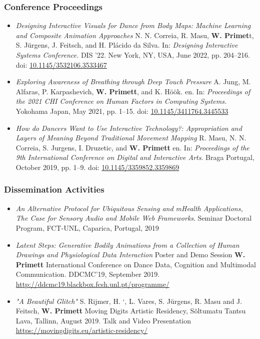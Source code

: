 \subsubsection{Conference Proceedings}
\begin{itemize}
    \item[] \textit{Designing Interactive Visuals for Dance from Body Maps: Machine Learning and
    Composite Animation Approaches}
    N. N. Correia, R. Masu, \textbf{W. Primet}t, S. Jürgens, J. Feitsch, and H. Plácido da Silva.
    In: \textit{Designing Interactive Systems Conference.}
    DIS ’22. New York, NY, USA, June 2022, pp. 204–216. doi: \url{10.1145/3532106.3533467}

    \item[] \textit{Exploring Awareness of Breathing through Deep Touch Pressure}
    A. Jung, M. Alfaras, P. Karpashevich, \textbf{W. Primett}, and K. Höök.
    en. In: \textit{Proceedings of the 2021 CHI Conference on Human Factors in Computing Systems.} Yokohama Japan, May 2021,
    pp. 1–15. doi: \url{10.1145/3411764.3445533}

    \item[] \textit{How do Dancers Want to Use Interactive Technology?: Appropriation and Layers of Meaning Beyond Traditional Movement Mapping}
    R. Masu, N. N. Correia, S. Jurgens, I. Druzetic, and \textbf{W. Primett}
    en. In: \textit{Proceedings of the 9th International Conference on Digital and Interactive Arts}. Braga Portugal, October 2019, pp. 1–9. doi: \url{10.1145/3359852.3359869}
\end{itemize}

\subsubsection{Dissemination Activities}
    \begin{itemize}

    \item[] \textit{An Alternative Protocol for Ubiquitous Sensing and mHealth Applications, The Case for Sensory Audio and Mobile Web Frameworks}. Seminar Doctoral Program, FCT-UNL, Caparica, Portugal, 2019

    \item[] \textit{Latent Steps: Generative Bodily Animations from a Collection of Human Drawings and Physiological Data Interaction} Poster and Demo Session
    \textbf{W. Primett}
    International Conference on Dance Data, Cognition and Multimodal Communication. DDCMC’19, September 2019.
    \url{http://ddcmc19.blackbox.fcsh.unl.pt/programme/}

    \item[] \textit{"A Beautiful Glitch"}
        S. Rijmer, H. `, L. Vares, S. Jürgens, R. Masu and J. Feitsch, \textbf{W. Primett}
    Moving Digits Artistic Residency, Sõltumatu Tantsu Lava, Tallinn, August 2019. Talk and Video Presentation
    \url{https://movingdigits.eu/artistic-residency/}
    \end{itemize}


